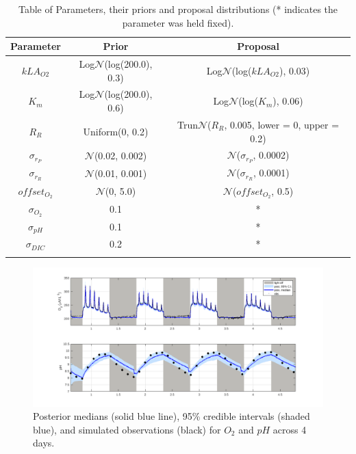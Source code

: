 \documentclass{ruthesis}
\begin{document}
\FloatBarrier
\begin{longtable}{|c | c  |  c|}
	\hline
	\bfseries{Parameter} & \bfseries{Prior} &  \bfseries{Proposal} \\ \hline
	$kLA_{O2}$  & Log$\mathcal{N}$(log(200.0), 0.3)  & Log$\mathcal{N}$(log($kLA_{O2}$), 0.03) \\
	$K_m$ 		&  Log$\mathcal{N}$(log(200.0), 0.6) & Log$\mathcal{N}$(log($K_m$), 0.06) \\
	$R_R$  		& Uniform(0, 0.2) &  Trun$\mathcal{N}$($R_R$, 0.005, lower = 0, upper = 0.2) \\
	$\sigma_{r_P}$ & $\mathcal{N}$(0.02, 0.002)   & $\mathcal{N}$($\sigma_{r_P}$, 0.0002)   \\
	$\sigma_{r_R}$ & $\mathcal{N}$(0.01, 0.001)   & $\mathcal{N}$($\sigma_{r_R}$, 0.0001)   \\
	$offset_{O_2}$ & $\mathcal{N}$(0, 5.0)     & $\mathcal{N}$($offset_{O_2}$, 0.5)   \\
	$\sigma_{O_2}$ 	& 0.1 	& * \\
	$\sigma_{pH}$ 	& 0.1 	& * \\
	$\sigma_{DIC}$ 	& 0.2 	& * \\
	\hline
	\caption[.]{Table of Parameters, their priors and proposal distributions (* indicates the parameter was held fixed).}	
	\label{tab:micro_priors_chris_offset}
\end{longtable}




\FloatBarrier
\begin{figure}
	\centerline{\includegraphics[width=1.2\textwidth]{images_microalgae/plots_chris_offset/O2_pH}}
	\caption[.]{Posterior medians (solid blue line), 95\% credible intervals (shaded blue), and simulated observations (black) for $O_2$ and $pH$ across 4 days.}
	\label{fig:micro_exp_offset_O2_pH}
\end{figure}
\end{document}
